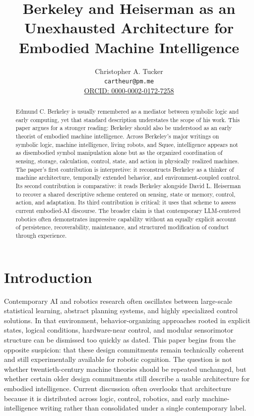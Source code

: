 \documentclass[11pt]{article}
\title{Berkeley and Heiserman as an Unexhausted Architecture for\\
Embodied Machine Intelligence}
\author{Christopher A. Tucker\\
\small \texttt{cartheur@pm.me}\\
\small \href{https://orcid.org/0000-0002-0172-7258}{ORCID: 0000-0002-0172-7258}}
\date{}
\begin{document}
\maketitle

\begin{abstract}
Edmund C. Berkeley is usually remembered as a mediator between symbolic logic and early computing, yet that standard description understates the scope of his work. This paper argues for a stronger reading: Berkeley should also be understood as an early theorist of embodied machine intelligence. Across Berkeley's major writings on symbolic logic, machine intelligence, living robots, and Squee, intelligence appears not as disembodied symbol manipulation alone but as the organized coordination of sensing, storage, calculation, control, state, and action in physically realized machines. The paper's first contribution is interpretive: it reconstructs Berkeley as a thinker of machine architecture, temporally extended behavior, and environment-coupled control. Its second contribution is comparative: it reads Berkeley alongside David L. Heiserman to recover a shared descriptive scheme centered on sensing, state or memory, control, action, and adaptation. Its third contribution is critical: it uses that scheme to assess current embodied-AI discourse. The broader claim is that contemporary LLM-centered robotics often demonstrates impressive capability without an equally explicit account of persistence, recoverability, maintenance, and structured modification of conduct through experience.
\end{abstract}

\onehalfspacing

\section{Introduction}

Contemporary AI and robotics research often oscillates between large-scale statistical learning, abstract planning systems, and highly specialized control solutions. In that environment, behavior-organizing approaches rooted in explicit states, logical conditions, hardware-near control, and modular sensorimotor structure can be dismissed too quickly as dated. This paper begins from the opposite suspicion: that these design commitments remain technically coherent and still experimentally available for robotic cognition. The question is not whether twentieth-century machine theories should be repeated unchanged, but whether certain older design commitments still describe a usable architecture for embodied intelligence. Current discussion often overlooks that architecture because it is distributed across logic, control, robotics, and early machine-intelligence writing rather than consolidated under a single contemporary label.
\end{document}
